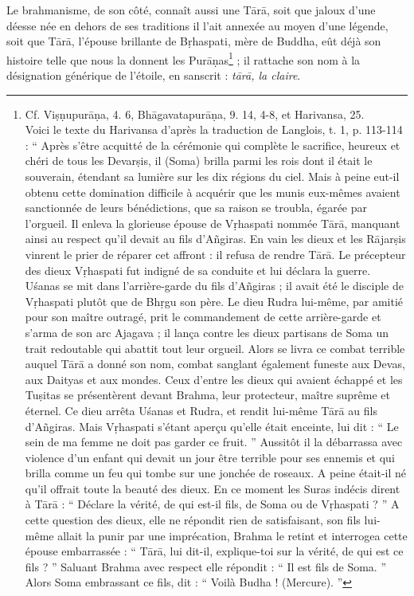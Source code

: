 \documentclass[a4paper, 11pt, oneside, french]{article}
\begin{document}
Le brahmanisme, de son côté, connaît aussi une T\={a}r\={a}, soit que jaloux d'une déesse née en dehors de ses traditions il l'ait annexée au moyen d'une légende, soit que T\={a}r\={a}, l'épouse brillante de B\d{r}haspati, mère de Buddha, eût déjà son histoire telle que nous la donnent les Pur\={a}\d{n}as\footnote{Cf. Vi\d{s}\d{n}upur\={a}\d{n}a, 4. 6, Bh\={a}gavatapur\={a}\d{n}a, 9. 14, 4-8, et Harivansa, 25.\\\hspace*{5mm}Voici le texte du Harivansa d'après la traduction de Langlois, t. 1, p. 113-114 : `` Après s'être acquitté de la cérémonie qui complète le sacrifice, heureux et chéri de tous les Devar\d{s}is, il (Soma) brilla parmi les rois dont il était le souverain, étendant sa lumière sur les dix régions du ciel. Mais à peine eut-il obtenu cette domination difficile à acquérir que les munis eux-mêmes avaient sanctionnée de leurs bénédictions, que sa raison se troubla, égarée par l'orgueil. Il enleva la glorieuse épouse de V\d{r}haspati nommée T\={a}r\={a}, manquant ainsi au respect qu'il devait au fils d'A\~{n}giras. En vain les dieux et les R\={a}jar\d{s}is vinrent le prier de réparer cet affront : il refusa de rendre T\={a}r\={a}. Le précepteur des dieux V\d{r}haspati fut indigné de sa conduite et lui déclara la guerre. U\'{s}anas se mit dans l'arrière-garde du fils d'A\~{n}giras ; il avait été le disciple de V\d{r}haspati plutôt que de Bh\d{r}gu son père. Le dieu Rudra lui-même, par amitié pour son maître outragé, prit le commandement de cette arrière-garde et s'arma de son arc Ajagava ; il lança contre les dieux partisans de Soma un trait redoutable qui abattit tout leur orgueil. Alors se livra ce combat terrible auquel T\={a}r\={a} a donné son nom, combat sanglant également funeste aux Devas, aux Daityas et aux mondes. Ceux d'entre les dieux qui avaient échappé et les Tu\d{s}itas se présentèrent devant Brahma, leur protecteur, maître suprême et éternel. Ce dieu arrêta U\'{s}anas et Rudra, et rendit lui-même T\={a}r\={a} au fils d'A\~{n}giras. Mais V\d{r}haspati s'étant aperçu qu'elle était enceinte, lui dit : `` Le sein de ma femme ne doit pas garder ce fruit. '' Aussitôt il la débarrassa avec violence d'un enfant qui devait un jour être terrible pour ses ennemis et qui brilla comme un feu qui tombe sur une jonchée de roseaux. A peine était-il né qu'il offrait toute la beauté des dieux. En ce moment les Suras indécis dirent à T\={a}r\={a} : `` Déclare la vérité, de qui est-il fils, de Soma ou de V\d{r}haspati ? '' A cette question des dieux, elle ne répondit rien de satisfaisant, son fils lui-même allait la punir par une imprécation, Brahma le retint et interrogea cette épouse embarrassée : `` T\={a}r\={a}, lui dit-il, explique-toi sur la vérité, de qui est ce fils ? '' Saluant Brahma avec respect elle répondit : `` Il est fils de Soma. '' Alors Soma embrassant ce fils, dit : `` Voilà Budha ! (Mercure). ''} ; il rattache son nom à la désignation générique de l'étoile, en sanscrit : \emph{t\={a}r\={a}, la claire}.
\end{document}
